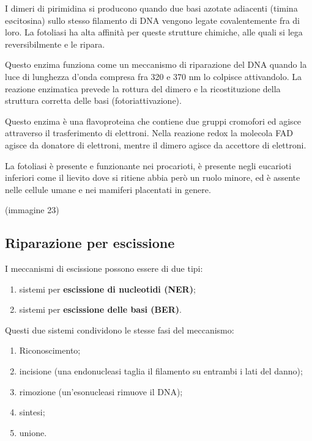 \documentclass[11pt]{book}
\begin{document}
I dimeri di pirimidina si producono quando due basi azotate adiacenti
(timina e\o citosina) sullo stesso filamento di DNA vengono legate
covalentemente fra di loro. La fotoliasi ha alta affinità per queste
strutture chimiche, alle quali si lega reversibilmente e le ripara.

Questo enzima funziona come un meccanismo di riparazione del DNA quando
la luce di lunghezza d'onda compresa fra 320 e 370 nm lo colpisce
attivandolo. La reazione enzimatica prevede la rottura del dimero e la
ricostituzione della struttura corretta delle basi (fotoriattivazione).

Questo enzima è una flavoproteina che contiene due gruppi cromofori ed
agisce attraverso il trasferimento di elettroni. Nella reazione redox la
molecola FAD agisce da donatore di elettroni, mentre il dimero agisce da
accettore di elettroni.

La fotoliasi è presente e funzionante nei procarioti, è presente negli
eucarioti inferiori come il lievito dove si ritiene abbia però un ruolo
minore, ed è assente nelle cellule umane e nei mamiferi placentati in
genere.

(immagine 23)

\subsection{Riparazione per
escissione}\label{riparazione-per-escissione}

I meccanismi di escissione possono essere di due tipi:

\begin{enumerate}
\def\labelenumi{\arabic{enumi}.}
\itemsep1pt\parskip0pt
\item
  sistemi per \textbf{escissione di nucleotidi (NER)};
\item
  sistemi per \textbf{escissione delle basi (BER)}.
\end{enumerate}

Questi due sistemi condividono le stesse fasi del meccanismo:

\begin{enumerate}
\def\labelenumi{\arabic{enumi}.}
\itemsep1pt\parskip0pt
\item
  Riconoscimento;
\item
  incisione (una endonucleasi taglia il filamento su entrambi i lati del
  danno);
\item
  rimozione (un'esonucleasi rimuove il DNA);
\item
  sintesi;
\item
  unione.
\end{enumerate}
\end{document}
